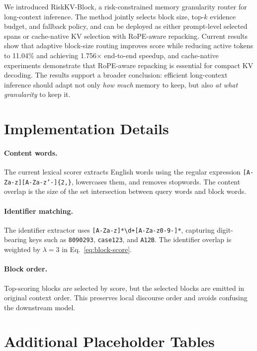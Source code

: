 \documentclass{article}
\newcommand{\method}{RiskKV-Block}
\begin{document}
We introduced \method, a risk-constrained memory granularity router for long-context inference.
The method jointly selects block size, top-$k$ evidence budget, and fallback policy, and can be deployed as either prompt-level selected spans or cache-native KV selection with RoPE-aware repacking.
Current results show that adaptive block-size routing improves score while reducing active tokens to 11.04\% and achieving 1.756$\times$ end-to-end speedup, and cache-native experiments demonstrate that RoPE-aware repacking is essential for compact KV decoding.
The results support a broader conclusion: efficient long-context inference should adapt not only \emph{how much} memory to keep, but also \emph{at what granularity} to keep it.




\appendix

\section{Implementation Details}

\paragraph{Content words.}
The current lexical scorer extracts English words using the regular expression \texttt{[A-Za-z][A-Za-z'-]\{2,\}}, lowercases them, and removes stopwords.
The content overlap is the size of the set intersection between query words and block words.

\paragraph{Identifier matching.}
The identifier extractor uses \texttt{[A-Za-z]*\textbackslash d+[A-Za-z0-9-]*}, capturing digit-bearing keys such as \texttt{8090293}, \texttt{case123}, and \texttt{A12B}.
The identifier overlap is weighted by $\lambda=3$ in Eq.~\ref{eq:block-score}.

\paragraph{Block order.}
Top-scoring blocks are selected by score, but the selected blocks are emitted in original context order.
This preserves local discourse order and avoids confusing the downstream model.

\section{Additional Placeholder Tables}
\end{document}
